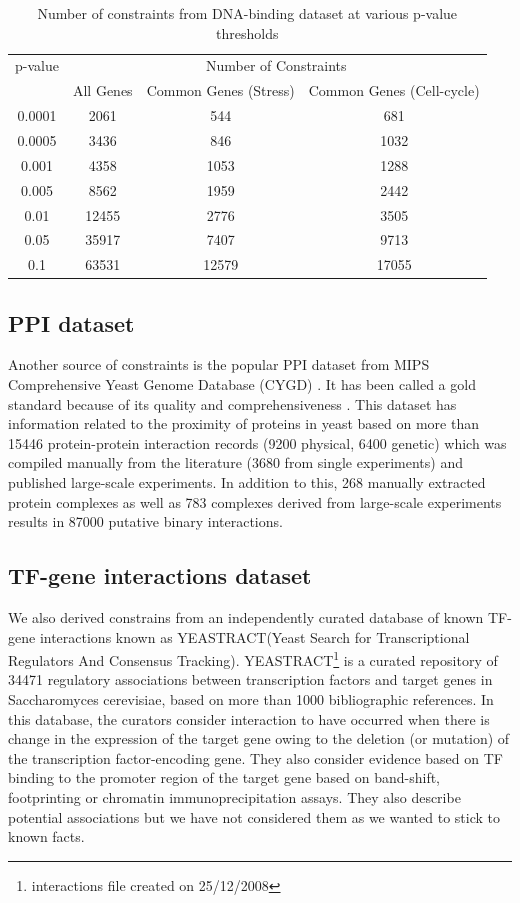 \begin{table}
\centering
\begin{tabular}{|c|c|c|c|}
\hline
p-value & \multicolumn{3}{|c|}{Number of Constraints} \\ \cline{2-4}
& All Genes & Common Genes (Stress) & Common Genes (Cell-cycle)\\
\hline
0.0001 & 2061  & 544   & 681\\
0.0005 & 3436  & 846   & 1032\\
0.001  & 4358  & 1053  & 1288\\
0.005  & 8562  & 1959  & 2442\\
0.01   & 12455 & 2776  & 3505\\
0.05   & 35917 & 7407  & 9713\\
0.1    & 63531 & 12579 & 17055\\
\hline 
\end{tabular}
\caption{Number of constraints from DNA-binding dataset at various p-value thresholds}
\label{tab:no_constraints}
\end{table}

\subsection{PPI dataset}
Another source of constraints is the popular PPI dataset from MIPS Comprehensive Yeast Genome Database (CYGD) \citep{Gueldener2006MPact}. It has been called a gold standard 
because of its quality and comprehensiveness \citep{yu2004annotation}. This dataset has information related to the proximity of proteins in yeast based on more than 
15446 protein-protein interaction records (9200 physical, 6400 genetic) which was compiled manually from the literature (3680 from single experiments) and published large-scale 
experiments. In addition to this, 268 manually extracted protein complexes as well as 783 complexes derived from large-scale experiments results in 87000 putative 
binary interactions. 

\subsection{TF-gene interactions dataset} \label{yeastract-db}
We also derived constrains from an independently curated database of known TF-gene interactions known as YEASTRACT(Yeast Search for Transcriptional Regulators And Consensus Tracking). 
YEASTRACT\footnote{interactions file created on 25/12/2008} \citep{Teixeira06yeastract} is a curated repository of 34471 regulatory associations between transcription factors and 
target genes in Saccharomyces cerevisiae, based on more than 1000 bibliographic references. In this database, the curators consider interaction to have occurred when there is change in the expression of the target gene owing to the deletion (or mutation) of the transcription factor-encoding gene. They also consider evidence based on TF binding to the promoter region of the target gene based on band-shift, footprinting or chromatin immunoprecipitation assays. They also describe potential associations but we have not considered them as we wanted to stick to known facts. 

